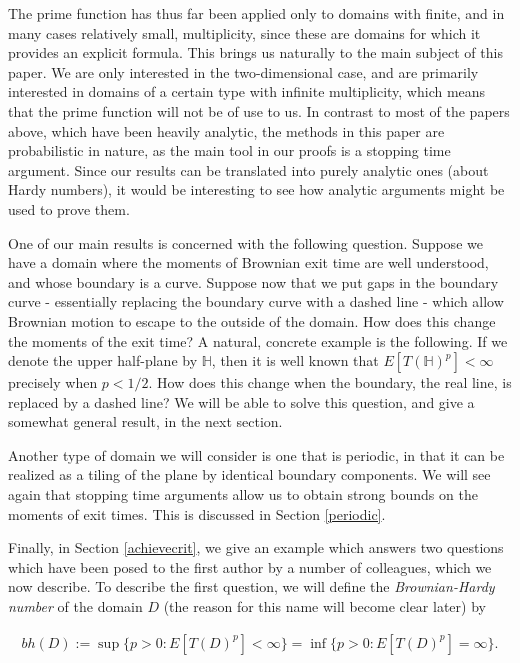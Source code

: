 \documentclass[a4paper, oneside, 12pt]{amsart}
\newcommand{\HH}{\mathbb{H}}
\begin{document}
The prime function has thus far been applied only to domains with finite, and in many cases relatively small, multiplicity, since these are domains for which it provides an explicit formula. This brings us naturally to the main subject of this paper. We are only interested in the two-dimensional case, and are primarily interested in domains of a certain type with infinite multiplicity, which means that the prime function will not be of use to us. In contrast to most of the papers above, which have been heavily analytic, the methods in this
paper are probabilistic in nature, as the main tool in our proofs is a stopping time
argument. Since our results can be translated into purely analytic ones (about Hardy numbers), it would be interesting to see how analytic arguments might be used to prove them.

One of our main results is concerned with the following question. Suppose we have a domain where the moments of Brownian exit time are well understood, and whose boundary is a curve. Suppose now that we put gaps in the boundary curve - essentially replacing the boundary curve with a dashed line - which allow Brownian motion to escape to the outside of the domain. How does this change the moments of the exit time? A natural, concrete example is the following. If we denote the upper half-plane by $\HH$, then it is well known that $E[T(\HH)^p] < \infty$ precisely when $p < 1/2$. How does this change when the boundary, the real line, is replaced by a dashed line? We will be able to solve this question, and give a somewhat general result, in the next section.

Another type of domain we will consider is one that is periodic, in that it can be realized as a
tiling of the plane by identical boundary components. We will see again that
stopping time arguments allow us to obtain strong bounds on the moments of exit
times. This is discussed in Section \ref{periodic}.

Finally, in Section \ref{achievecrit}, we give an example which answers two questions which have been posed to the first author by a number of colleagues, which we now describe. To describe the first question, we will define the {\it Brownian-Hardy number} of the domain $D$ (the reason for this name will become clear later) by

\begin{align*}
    bh(D) := \sup \{p>0: E[T(D)^p] <\infty\} = \inf \{p>0: E[T(D)^p] =\infty\}.
\end{align*}
\end{document}
